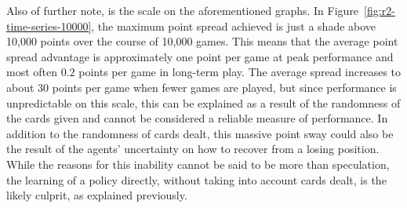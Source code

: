 Also of further note, is the scale on the aforementioned graphs.
%
In Figure~\ref{fig:r2-time-series-10000},
the maximum point spread achieved is just a shade above 10,000 points
over the course of 10,000 games.
%
This means that the average point spread advantage is approximately 
one point per game at peak performance\textemdash
and most often $0.2$ points per game\textemdash
in long-term play.
%
The average spread increases to about $30$ points per game when fewer games are 
played,
but since performance is unpredictable on this scale,
this can be explained as a result of the randomness of the cards given
and cannot be considered a reliable measure of performance.
%
In addition to the randomness of cards dealt,
this massive point sway could also be the result of the agents' uncertainty on 
how to recover from a losing position.
%
While the reasons for this inability cannot be said to be more than speculation,
the learning of a policy directly, without taking into account cards dealt,
is the likely culprit,
as explained previously.

